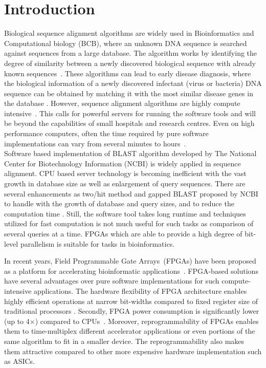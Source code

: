 \section{Introduction}
\label{sec:introduction}

Biological sequence alignment algorithms are widely used in Bioinformatics and Computational biology (BCB), where an unknown DNA sequence is searched against sequences from a large database. 
The algorithm works by identifying the degree of similarity between a newly discovered biological sequence with already known sequences~\cite{kasap2008design}.
These algorithms can lead to early disease diagnosis, where the biological information of a newly discovered infectant (virus or bacteria) DNA sequence can be obtained by matching it with the most similar disease genes in the database \cite{guo2012systolic}. 
However, sequence alignment algorithms are highly compute intensive~\cite{datta2009}. 
This calls for powerful servers for running the software tools and will be beyond the capabilities of small hospitals and research centres.
Even on high performance computers, often the time required by pure software implementations can vary from several minutes to hours~\cite{masato2016}.  
\\
Software based implementation of BLAST algorithm developed by The National Center for Biotechnology Information (NCBI) \cite{ncbiBlast} is widely applied in sequence alignment. CPU based server technology is becoming inefficient with the vast growth in database size as well as enlargement of query sequences. There are several enhancements as two/hit method and gapped BLAST proposed by NCBI to handle with the growth of database and query sizes, and to reduce the computation time \cite{WIENBRANDT20111967}. Still, the software tool takes long runtime and techniques utilized for fast computation is not much useful for such tasks as comparison of several queries at a time. FPGAs which are able to provide a high degree of bit-level parallelism is suitable for tasks in bioinformatics.

In recent years, Field Programmable Gate Arrays~(FPGAs) have been proposed as a platform for accelerating bioinformatic applications~\cite{kasap2008design}. 
FPGA-based solutions have several advantages over pure software implementations for such compute-intensive applications.
The hardware flexibility of FPGA architecture enables highly efficient operations at narrow bit-widths compared to fixed register size of traditional processors \cite{cug2007}. 
Secondly, FPGA power consumption is significantly lower (up to 4$\times$) compared to CPUs~\cite{cug2007}. 
Moreover, reprogrammability of FPGAs enables them to time-multiplex different accelerator applications or even portions of the same algorithm to fit in a smaller device. 
The reprogrammability also makes them attractive compared to other more expensive hardware implementation such as ASICs. 

